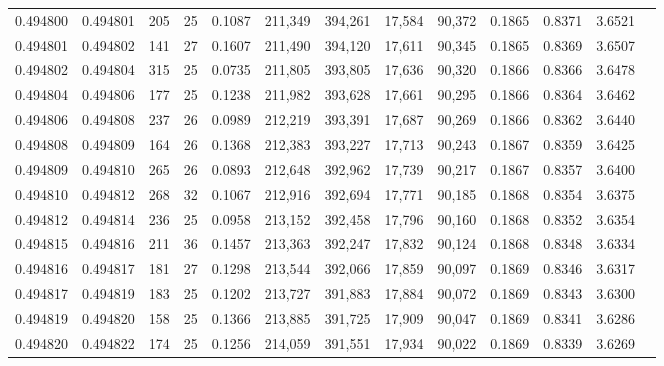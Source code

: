 \begin{tabular}{rrrrrrrrrrrrr}
0.494800 & 0.494801 & 205 &  25 &                                     0.1087 & 211,349 & 394,261 &  17,584 &  90,372 & 0.1865 & 0.8371 & 3.6521 \\
0.494801 & 0.494802 & 141 &  27 &                                     0.1607 & 211,490 & 394,120 &  17,611 &  90,345 & 0.1865 & 0.8369 & 3.6507 \\
0.494802 & 0.494804 & 315 &  25 &                                     0.0735 & 211,805 & 393,805 &  17,636 &  90,320 & 0.1866 & 0.8366 & 3.6478 \\
0.494804 & 0.494806 & 177 &  25 &                                     0.1238 & 211,982 & 393,628 &  17,661 &  90,295 & 0.1866 & 0.8364 & 3.6462 \\
0.494806 & 0.494808 & 237 &  26 &                                     0.0989 & 212,219 & 393,391 &  17,687 &  90,269 & 0.1866 & 0.8362 & 3.6440 \\
0.494808 & 0.494809 & 164 &  26 &                                     0.1368 & 212,383 & 393,227 &  17,713 &  90,243 & 0.1867 & 0.8359 & 3.6425 \\
0.494809 & 0.494810 & 265 &  26 &                                     0.0893 & 212,648 & 392,962 &  17,739 &  90,217 & 0.1867 & 0.8357 & 3.6400 \\
0.494810 & 0.494812 & 268 &  32 &                                     0.1067 & 212,916 & 392,694 &  17,771 &  90,185 & 0.1868 & 0.8354 & 3.6375 \\
0.494812 & 0.494814 & 236 &  25 &                                     0.0958 & 213,152 & 392,458 &  17,796 &  90,160 & 0.1868 & 0.8352 & 3.6354 \\
0.494815 & 0.494816 & 211 &  36 &                                     0.1457 & 213,363 & 392,247 &  17,832 &  90,124 & 0.1868 & 0.8348 & 3.6334 \\
0.494816 & 0.494817 & 181 &  27 &                                     0.1298 & 213,544 & 392,066 &  17,859 &  90,097 & 0.1869 & 0.8346 & 3.6317 \\
0.494817 & 0.494819 & 183 &  25 &                                     0.1202 & 213,727 & 391,883 &  17,884 &  90,072 & 0.1869 & 0.8343 & 3.6300 \\
0.494819 & 0.494820 & 158 &  25 &                                     0.1366 & 213,885 & 391,725 &  17,909 &  90,047 & 0.1869 & 0.8341 & 3.6286 \\
0.494820 & 0.494822 & 174 &  25 &                                     0.1256 & 214,059 & 391,551 &  17,934 &  90,022 & 0.1869 & 0.8339 & 3.6269 \\

\end{tabular}
